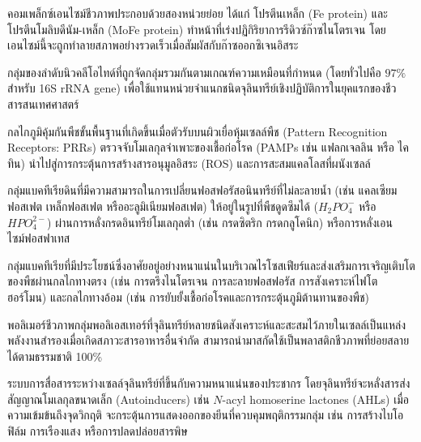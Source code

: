 \begin{description}[leftmargin=1.8cm, style=nextline, font=\bfseries\color{agriGreen}]
\item[Nitrogenase Enzyme Complex]
คอมเพล็กซ์เอนไซม์ชีวภาพประกอบด้วยสองหน่วยย่อย ได้แก่ โปรตีนเหล็ก (Fe protein) และโปรตีนโมลิบดีนัม-เหล็ก (MoFe protein) ทำหน้าที่เร่งปฏิกิริยาการรีดิวซ์ก๊าซไนโตรเจน โดยเอนไซม์นี้จะถูกทำลายสภาพอย่างรวดเร็วเมื่อสัมผัสกับก๊าซออกซิเจนอิสระ

\item[Operational Taxonomic Unit (OTU)]
กลุ่มของลำดับนิวคลีโอไทด์ที่ถูกจัดกลุ่มรวมกันตามเกณฑ์ความเหมือนที่กำหนด (โดยทั่วไปคือ $97\%$ สำหรับ 16S rRNA gene) เพื่อใช้แทนหน่วยจำแนกชนิดจุลินทรีย์เชิงปฏิบัติการในยุคแรกของชีวสารสนเทศศาสตร์

\item[Pattern-Triggered Immunity (PTI)]
กลไกภูมิคุ้มกันพืชขั้นพื้นฐานที่เกิดขึ้นเมื่อตัวรับบนผิวเยื่อหุ้มเซลล์พืช (Pattern Recognition Receptors: PRRs) ตรวจจับโมเลกุลจำเพาะของเชื้อก่อโรค (PAMPs เช่น แฟลกเจลลิน หรือ ไคทิน) นำไปสู่การกระตุ้นการสร้างสารอนุมูลอิสระ (ROS) และการสะสมแคลโลสที่ผนังเซลล์

\item[Phosphate-Solubilizing Bacteria (PSB)]
กลุ่มแบคทีเรียดินที่มีความสามารถในการเปลี่ยนฟอสฟอรัสอนินทรีย์ที่ไม่ละลายน้ำ (เช่น แคลเซียมฟอสเฟต เหล็กฟอสเฟต หรืออะลูมิเนียมฟอสเฟต) ให้อยู่ในรูปที่พืชดูดซึมได้ ($H_2PO_4^-$ หรือ $HPO_4^{2-}$) ผ่านการหลั่งกรดอินทรีย์โมเลกุลต่ำ (เช่น กรดซิตริก กรดกลูโคนิก) หรือการหลั่งเอนไซม์ฟอสฟาเทส

\item[Plant Growth-Promoting Rhizobacteria (PGPR)]
กลุ่มแบคทีเรียที่มีประโยชน์ซึ่งอาศัยอยู่อย่างหนาแน่นในบริเวณไรโซสเฟียร์และส่งเสริมการเจริญเติบโตของพืชผ่านกลไกทางตรง (เช่น การตรึงไนโตรเจน การละลายฟอสฟอรัส การสังเคราะห์ไฟโตฮอร์โมน) และกลไกทางอ้อม (เช่น การยับยั้งเชื้อก่อโรคและการกระตุ้นภูมิต้านทานของพืช)

\item[Polyhydroxyalkanoates (PHAs)]
พอลิเมอร์ชีวภาพกลุ่มพอลิเอสเทอร์ที่จุลินทรีย์หลายชนิดสังเคราะห์และสะสมไว้ภายในเซลล์เป็นแหล่งพลังงานสำรองเมื่อเกิดสภาวะสารอาหารอื่นจำกัด สามารถนำมาสกัดใช้เป็นพลาสติกชีวภาพที่ย่อยสลายได้ตามธรรมชาติ 100\%

\item[Quorum Sensing (QS)]
ระบบการสื่อสารระหว่างเซลล์จุลินทรีย์ที่ขึ้นกับความหนาแน่นของประชากร โดยจุลินทรีย์จะหลั่งสารส่งสัญญาณโมเลกุลขนาดเล็ก (Autoinducers) เช่น $N$-acyl homoserine lactones (AHLs) เมื่อความเข้มข้นถึงจุดวิกฤติ จะกระตุ้นการแสดงออกของยีนที่ควบคุมพฤติกรรมกลุ่ม เช่น การสร้างไบโอฟิล์ม การเรืองแสง หรือการปลดปล่อยสารพิษ


\end{description}
